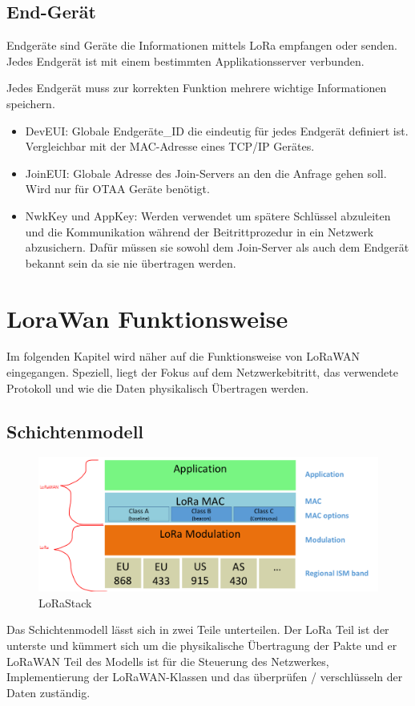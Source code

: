 \documentclass[a4paper,12pt]{article}
\begin{document}
        \subsection{End-Gerät}
            Endgeräte sind Geräte die Informationen mittels LoRa empfangen oder senden. Jedes Endgerät ist mit einem 
            bestimmten Applikationsserver verbunden.

            Jedes Endgerät muss zur korrekten Funktion mehrere wichtige Informationen speichern.
            \begin{itemize}
                \item DevEUI: Globale Endgeräte\_ID die eindeutig für jedes Endgerät definiert ist. Vergleichbar 
                mit der MAC-Adresse eines TCP/IP Gerätes.
                \item JoinEUI: Globale Adresse des Join-Servers an den die Anfrage gehen soll. Wird nur für OTAA Geräte
                benötigt.
                \item NwkKey und AppKey: Werden verwendet um spätere Schlüssel abzuleiten und die Kommunikation während
                der Beitrittprozedur in ein Netzwerk abzusichern. Dafür müssen sie sowohl dem Join-Server als auch dem
                Endgerät bekannt sein da sie nie übertragen werden.
            \end{itemize}
            \cite[S.47 ff.]{LoRaSpec}

    \section{LoraWan Funktionsweise}
        Im folgenden Kapitel wird näher auf die Funktionsweise von LoRaWAN eingegangen. Speziell, liegt der Fokus auf
        dem Netzwerkebitritt, das verwendete Protokoll und wie die Daten physikalisch Übertragen werden.
        \subsection{Schichtenmodell}
            \begin{figure}
                \includegraphics[width=\textwidth]{LoraLayer}
                \caption{LoRaStack \cite[S.7]{WhatIsLoRa}}
            \end{figure}
            Das Schichtenmodell lässt sich in zwei Teile unterteilen. Der LoRa Teil ist der unterste und kümmert sich 
            um die physikalische Übertragung der Pakte und er LoRaWAN Teil des Modells ist für die Steuerung des 
            Netzwerkes, Implementierung der LoRaWAN-Klassen und das überprüfen / verschlüsseln der Daten zuständig.
\end{document}
